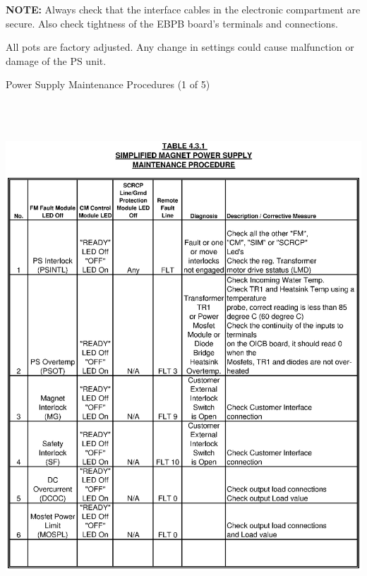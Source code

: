 {\bf NOTE:} Always check that the interface cables in the electronic
compartment are secure.  Also check tightness of the EBPB board's
terminals and connections.

All pots are factory adjusted.  Any change in settings could
cause malfunction or damage of the PS unit.


\clearpage
\begin{table}
\caption{Power Supply Maintenance Procedures (1 of 5) \label{tab:ps_maint_1}}
\includegraphics[height=7.5in,width=6.2in]{spectrometers/book1.ps}
\end{table}

